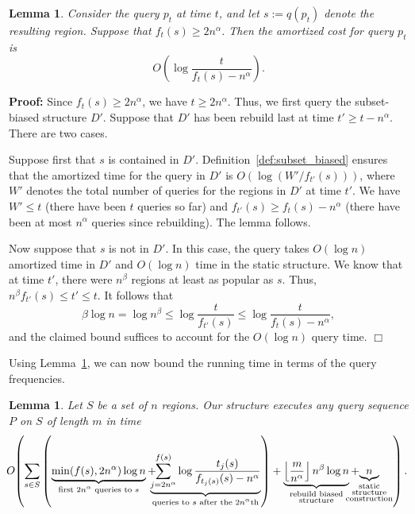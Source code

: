 \documentclass[11pt]{article}
\newtheorem{lemma}[figure]{Lemma}
\newenvironment{proof}{\noindent\textbf{Proof: }\ignorespaces}
  {\hspace*{\fill}$\Box$\medskip}
\newcommand{\eqdef}{:=}
\begin{document}
\begin{lemma} \label{singlequery} 
Consider the query $p_t$ at time $t$, and let $s \eqdef q(p_t)$ denote the 
resulting region.
Suppose that  $f_t(s) \geq 2 n^\alpha$. 
Then the amortized cost for query $p_t$ is
\[ 
O\left(  \log \frac{t}{f_t(s)-n^\alpha} \right).
\] 
\end{lemma}

\begin{proof} 
Since $f_t(s) \geq 2n^\alpha$, we have $t \geq 2n^\alpha$. Thus,
we first query the subset-biased structure $D'$.
Suppose that $D'$ has been rebuild last at time $t' \geq t - n^\alpha$. 
There are two cases. 

Suppose first that $s$ is
contained in $D'$.  Definition~\ref{def:subset_biased}
ensures that the amortized time for the query in $D'$ is 
$O(\log(W'/f_{t'}(s)))$, where $W'$ denotes the total number 
of queries for the regions in $D'$ at time
$t'$.
We have $W' \leq t$ (there have been $t$ queries so far) and 
$f_{t'}(s) \geq f_t(s) - n^\alpha$ (there have been at most $n^\alpha$
queries since rebuilding). The lemma follows.

Now suppose that $s$ is not in $D'$. In this case, the query 
takes $O(\log n)$ amortized time in $D'$ and $O(\log n)$ time in the
static structure. 
We know that at time $t'$, there were  $n^\beta$ regions 
at least as popular as $s$. Thus, $n^\beta f_{t'}(s)  \leq t' \leq t$. 
It follows that 
\[
\beta \log n = \log n^\beta \leq  \log \frac{t}{f_{t'}(s)} \leq 
\log \frac{t}{f_t(s) - n^\alpha},
\]
and the claimed bound 
suffices to account for the
$O(\log n)$ query time.
\end{proof}

\noindent
Using Lemma~\ref{singlequery}, we can now bound the running time
in terms of the query frequencies. 

\begin{lemma} \label{bigruntime} 
Let $S$ be a set of $n$ regions. Our structure executes any query sequence 
$P$ on $S$ of length $m$ in time
\[
\hspace{-3pt} O\hspace{-2pt} \left( \sum_{s \in S} \left(
\underbrace{\min(f(s), 2 n^\alpha) \log n}_{\text{first $2n^\alpha$ queries
to $s$}} + \hspace{-7pt} \underbrace{\sum_{j=2n^\alpha}^{f(s)} \log
\frac{t_j(s)}{f_{t_j(s)}(s)-n^\alpha}}_{\text{queries to $s$ after the
$2n^\alpha$th}} \right) + \underbrace{\left \lfloor
\frac{m}{n^\alpha} \right \rfloor n^\beta\log n}_{\substack{\text{rebuild
biased}\\\text{structure}}} + \hspace{-5mm}
\underbrace{n}_{\substack{
\text{static}\\ \text{structure}\\\text{construction}}} \right).
\]
\end{lemma}
\end{document}
